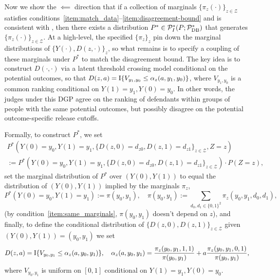 \documentclass[12pt]{article}%
\theoremstyle{definition}
\newcommand\1{\operatorname{I}\indicatorfence}
\begin{document}
\begin{appendices}
  Now we show the $\impliedby$ direction that if a collection of marginals
  $\{\pi_{z}(\cdot)\}_{z \in \mathcal{Z}}$ satisfies
  conditions~\ref{item:match_data}--\ref{item:disagreement-bound} and is consistent with , then there
  exists a distribution
  $P^* \in \mathcal{P}^*_{I}(P;\mathcal{P}^{*}_{\textnormal{DB}})$ that
  generates $\{\pi_{z}(\cdot) \}_{z \in \mathcal{Z}}$. At a high-level, the specified $\{\pi_z\}_z$ pin down the marginal distributions of $\{Y(\cdot), D(z, \cdot) \}_z$, so what remains is to specify a coupling of these marginals under $P^*$ to match the disagreement bound. The key idea is to construct $D(\cdot, \cdot)$ via a latent threshold crossing model conditional on the potential outcomes, so that $D(z, a) = \1{V_{y_1,y_0} \leq \alpha_z(a, y_1,y_0)}$, where $V_{y_1,y_0}$ is a common ranking conditional on $Y(1)=y_1,Y(0)=y_0$. In other words, the judges under this DGP agree on the ranking of defendants within groups of people with the same potential outcomes, but possibly disagree on the potential outcome-specific release cutoffs.

  Formally, to construct $P^{*}$, we set
  \begin{multline*}
    P^* \left(Y(0)=y_{0}, Y(1)=y_{1},
      \{D(z,0)=d_{z0},
      D(z,1)=d_{z1}\}_{z\in \mathcal{Z}}, Z=z \right)\\
    :=P^{*}\left(Y(0)=y_{0}, Y(1)=y_{1},
      \{D(z,0)=d_{z0},
      D(z,1)=d_{z1}\}_{z\in \mathcal{Z}} \right) \cdot
    P \left(Z =z \right),
  \end{multline*}
  set the marginal distribution of $P^{*}$ over $(Y(0), Y(1))$ to equal the
  distribution of $(Y(0), Y(1))$ implied by the marginals $\pi_{z}$,
  \begin{equation*}
    P^{*}(Y(0)=y_{0}, Y(1)=y_{1}):=\pi(y_{0}, y_{1}), \quad
    \pi(y_{0}, y_{1}):=
    \sum_{d_{0}, d_{1}\in\{0,1\}^{2}}\pi_{z}(y_{0},
    y_{1}, d_{0}, d_{1}),
  \end{equation*}
  (by condition~\ref{item:same_marginals}, $\pi(y_{0}, y_{1})$ doesn't depend on
  $z$), and finally, to define the conditional distribution of
  $\{D(z,0), D(z,1)\}_{z\in \mathcal{Z}}$ given $(Y(0), Y(1))=(y_{0}, y_{1})$
  we set
\begin{equation}\label{eqn: construction for dza}
  D(z, a) = \1{V_{y_0,y_1} \leq \alpha_{z}(a, y_{0}, y_{1})}, \quad
\alpha_{z}(a, y_{0}, y_{1})=\frac{\pi_{z}(y_0,y_1,1,1)}{\pi(y_0,y_1)} + a \frac{\pi_z(y_0,y_1,0,1)}{\pi(y_0,y_1)},
\end{equation}
where $V_{y_{0}, y_{1}}$ is uniform on $[0,1]$ conditional on $Y(1) = y_1, Y(0) = y_0$.


\end{appendices}
\end{document}
